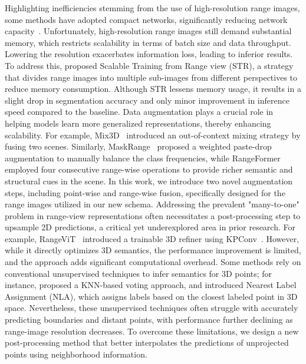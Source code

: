  Highlighting inefficiencies stemming from the use of high-resolution range images, some methods have adopted compact networks, significantly reducing network capacity~\cite{zhao2021fidnet, cortinhal2020salsanext, cheng2022cenet}. Unfortunately, high-resolution range images still demand substantial memory, which restricts scalability in terms of batch size and data throughput. Lowering the resolution exacerbates information loss, leading to inferior results. To address this, \citet{kong2023rethinking} proposed Scalable Training from Range view (STR), a strategy that divides range images into multiple sub-images from different perspectives to reduce memory consumption. Although STR lessens memory usage, it results in a slight drop in segmentation accuracy and only minor improvement in inference speed compared to the baseline.
 Data augmentation plays a crucial role in helping models learn more generalized representations, thereby enhancing scalability. For example, Mix3D~\cite{nekrasov2021mix3d} introduced an out-of-context mixing strategy by fusing two scenes. Similarly, MaskRange~\cite{gu2022maskrange} proposed a weighted paste-drop augmentation to manually balance the class frequencies, while RangeFormer~\cite{kong2023rethinking} employed four consecutive range-wise operations to provide richer semantic and structural cues in the scene. In this work, we introduce two novel augmentation steps, including point-wise and range-wise fusion, specifically designed for the range images utilized in our new schema.
 Addressing the prevalent "many-to-one" problem in range-view representations often necessitates a post-processing step to upsample 2D predictions, a critical yet underexplored area in prior research. For example, RangeViT~\cite{ando2023rangevit} introduced a trainable 3D refiner using KPConv~\cite{thomas2019kpconv}. However, while it directly optimizes 3D semantics, the performance improvement is limited, and the approach adds significant computational overhead. Some methods rely on conventional unsupervised techniques to infer semantics for 3D points; for instance, \citet{2019rangenet++} proposed a KNN-based voting approach, and \citet{zhao2021fidnet} introduced Nearest Label Assignment (NLA), which assigns labels based on the closest labeled point in 3D space. Nevertheless, these unsupervised techniques often struggle with accurately predicting boundaries and distant points, with performance further declining as range-image resolution decreases. To overcome these limitations, we design a new post-processing method that better interpolates the predictions of unprojected points using neighborhood information.




